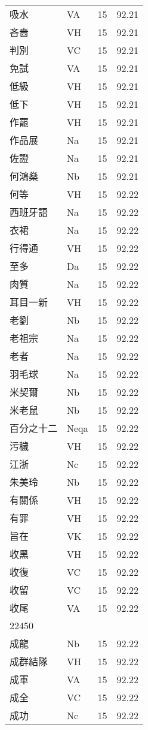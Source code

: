 \documentclass[twocolumn]{book}
\begin{document}
\begin{supertabular}{llrr}
吸水 & VA & 15 &  92.21\\
吝嗇 & VH & 15 &  92.21\\
判別 & VC & 15 &  92.21\\
免試 & VA & 15 &  92.21\\
低級 & VH & 15 &  92.21\\
低下 & VH & 15 &  92.21\\
作罷 & VH & 15 &  92.21\\
作品展 & Na & 15 &  92.21\\
佐證 & Na & 15 &  92.21\\
何鴻燊 & Nb & 15 &  92.21\\
何等 & VH & 15 &  92.22\\
西班牙語 & Na & 15 &  92.22\\
衣裙 & Na & 15 &  92.22\\
行得通 & VH & 15 &  92.22\\
至多 & Da & 15 &  92.22\\
肉質 & Na & 15 &  92.22\\
耳目一新 & VH & 15 &  92.22\\
老劉 & Nb & 15 &  92.22\\
老祖宗 & Na & 15 &  92.22\\
老者 & Na & 15 &  92.22\\
羽毛球 & Na & 15 &  92.22\\
米契爾 & Nb & 15 &  92.22\\
米老鼠 & Nb & 15 &  92.22\\
百分之十二 & Neqa & 15 &  92.22\\
污穢 & VH & 15 &  92.22\\
江浙 & Nc & 15 &  92.22\\
朱美玲 & Nb & 15 &  92.22\\
有關係 & VH & 15 &  92.22\\
有罪 & VH & 15 &  92.22\\
旨在 & VK & 15 &  92.22\\
收黑 & VH & 15 &  92.22\\
收復 & VC & 15 &  92.22\\
收留 & VC & 15 &  92.22\\
收尾 & VA & 15 &  92.22\\
22450\\
成龍 & Nb & 15 &  92.22\\
成群結隊 & VH & 15 &  92.22\\
成軍 & VA & 15 &  92.22\\
成全 & VC & 15 &  92.22\\
成功 & Nc & 15 &  92.22\\

\end{supertabular}
\end{document}
